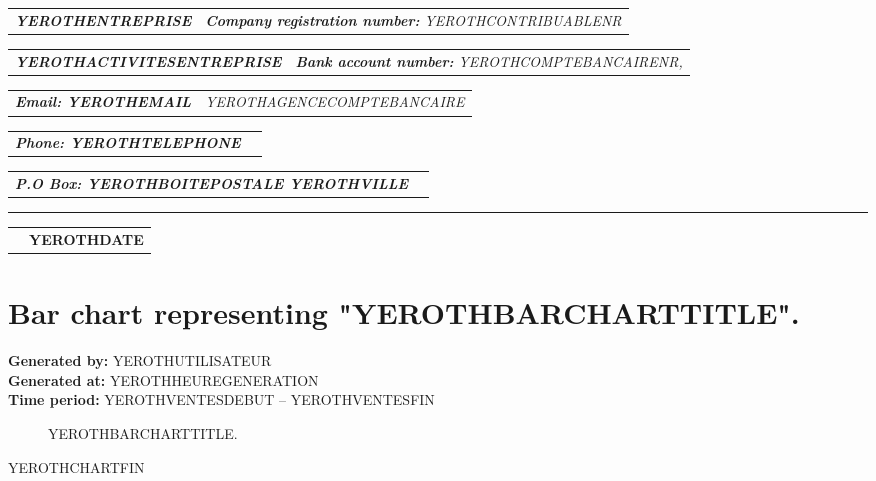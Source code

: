 \documentclass[11pt,YEROTHPAPERSPEC]{article} %
\makeatletter
\newcommand{\headerrow}[2]
{\begin{tabular*}{\linewidth}{l@{\extracolsep{\fill}}r}
	#1 &
	#2 \\
\end{tabular*}}
\newcommand{\emphbold}[1]{\textbf{\emph{#1}}\xspace}
\makeatother
\begin{document}
\bigskip

\headerrow
	{\emphbold{YEROTHENTREPRISE}}
	{\emph{\textbf{Company registration number:} YEROTHCONTRIBUABLENR}}
\headerrow
	{\emphbold{YEROTHACTIVITESENTREPRISE}}
	{\emph{\textbf{Bank account number:} YEROTHCOMPTEBANCAIRENR,}}
\headerrow
	{\emphbold{Email: YEROTHEMAIL}}
	{\emph{YEROTHAGENCECOMPTEBANCAIRE}}
\headerrow
	{\emphbold{Phone: YEROTHTELEPHONE}}
	{}
\headerrow
	{\emphbold{P.O Box: YEROTHBOITEPOSTALE YEROTHVILLE}}
	{}
	
\hrule

\headerrow
	{}
	{\textbf{YEROTHDATE}}

\section*{Bar chart representing "YEROTHBARCHARTTITLE".}
\textbf{Generated by:} YEROTHUTILISATEUR\\
\textbf{Generated at:} YEROTHHEUREGENERATION\\
\textbf{Time period:} YEROTHVENTESDEBUT -- YEROTHVENTESFIN

\begin{figure}[!htbp]
\setlength{\DTLbaroutlinewidth}{1pt}
\centering
{}
\caption{YEROTHBARCHARTTITLE.}
\end{figure}

YEROTHCHARTFIN
\end{document}
